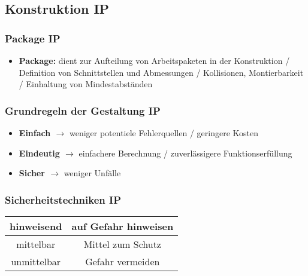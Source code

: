 \subsection{Konstruktion \hfill IP}
    \subsubsection{Package \hfill IP}
        \begin{scriptsize}
            \begin{center}
                \begin{itemize}
                    \item \textbf{Package:} dient zur Aufteilung von Arbeitspaketen in der Konstruktion / Definition von Schnittstellen und Abmessungen / Kollisionen, Montierbarkeit / Einhaltung von Mindestabständen
                \end{itemize}
            \end{center}
        \end{scriptsize}
    
    \subsubsection{Grundregeln der Gestaltung \hfill IP}
    \begin{scriptsize}
        \begin{center}
            \begin{itemize}
                \item \textbf{Einfach $\to$} weniger potentiele Fehlerquellen / geringere Kosten
                \item \textbf{Eindeutig $\to$} einfachere Berechnung / zuverlässigere Funktionserfüllung
                \item \textbf{Sicher $\to$} weniger Unfälle
            \end{itemize}
        \end{center}
    \end{scriptsize}

    \subsubsection{Sicherheitstechniken \hfill IP}
    \begin{footnotesize}
        \begin{center}
            \begin{tabular}{|c|c|}
                \hline
                \cellcolor{Red} hinweisend & auf Gefahr hinweisen \\
                \hline
                \cellcolor{Yellow} mittelbar & Mittel zum Schutz \\
                \hline
                \cellcolor{Green} unmittelbar & Gefahr vermeiden\\
                \hline
            \end{tabular}
        \end{center}
    \end{footnotesize}

